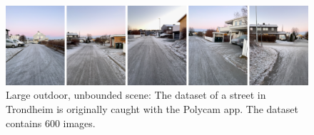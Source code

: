\begin{figure}[!ht]
    \centering
    \includegraphics[width=1.0\textwidth]{figures/streetview-dataset.png}
    \caption{Large outdoor, unbounded scene: The dataset of a street in Trondheim is originally caught with the Polycam app. The dataset contains 600 images.}
    \label{fig:streetview-dataset}
\end{figure}